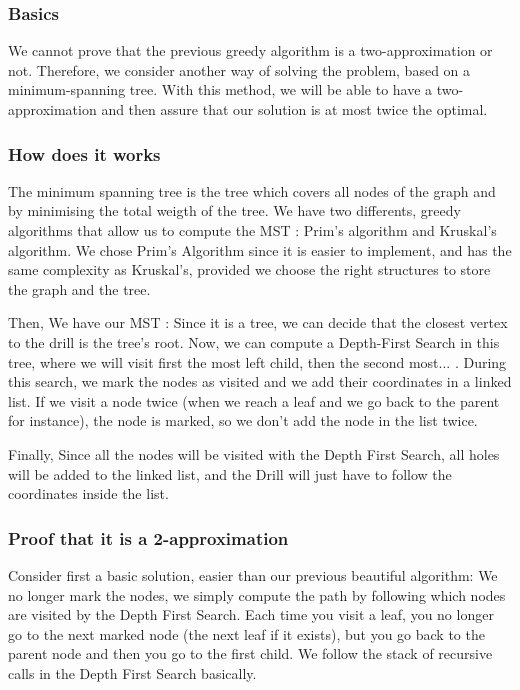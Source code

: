 \documentclass[11pt]{article}
\begin{document}
\subsubsection{Basics}
We cannot prove that the previous greedy algorithm is a two-approximation or not. Therefore, we consider another way of solving the problem, based on a minimum-spanning tree. With this method, we will be able to have a two-approximation and then assure that our solution is at most twice the optimal.
\subsubsection{How does it works}

The minimum spanning tree is the tree which covers all nodes of the graph and by minimising the total weigth of the tree.
We have two differents, greedy algorithms that allow us to compute the MST : Prim's algorithm and Kruskal's algorithm. We chose Prim's Algorithm since it is easier to implement, and has the same complexity as Kruskal's, provided we choose the right structures to store the graph and the tree.

Then, We have our MST : Since it is a tree, we can decide that the closest vertex to the drill is the tree's root.
Now, we can compute a Depth-First Search in this tree, where we will visit first the most left child, then the second most... .
During this search, we mark the nodes as visited and we add their coordinates in a linked list. If we visit a node twice (when we reach a leaf and we go back to the parent for instance), the node is marked, so we don't add the node in the list twice.

Finally, Since all the nodes will be visited with the Depth First Search, all holes will be added to the linked list, and the Drill will just have to follow the coordinates inside the list.

\subsubsection{Proof that it is a 2-approximation}

Consider first a basic solution, easier than our previous beautiful algorithm:
We no longer mark the nodes, we simply compute the path by following which nodes are visited by the Depth First Search. Each time you visit a leaf, you no longer go to the next marked node (the next leaf if it exists), but you go back to the parent node and then you go to the first child.
We follow the stack of recursive calls in the Depth First Search basically.
\end{document}
